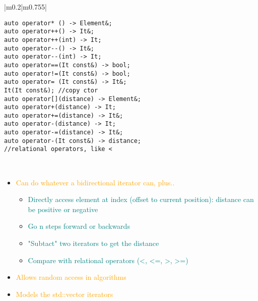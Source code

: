 \documentclass[main.tex,fontsize=8pt,paper=a4,paper=portrait,DIV=calc,]{scrartcl}
\begin{document}
\begin{table}[ht!]
\begin{tabular}{|m{0.2\linewidth}|m{0.755\linewidth}|}
\begin{lstlisting}
auto operator* () -> Element&;
auto operator++() -> It&;
auto operator++(int) -> It;
auto operator--() -> It&;
auto operator--(int) -> It;
auto operator==(It const&) -> bool;
auto operator!=(It const&) -> bool;
auto operator= (It const&) -> It&;
It(It const&); //copy ctor
auto operator[](distance) -> Element&;
auto operator+(distance) -> It;
auto operator+=(distance) -> It&;
auto operator-(distance) -> It;
auto operator-=(distance) -> It&;
auto operator-(It const&) -> distance;
//relational operators, like <
\end{lstlisting}
\, \newline
\begin{itemize}
\item \textcolor{orange}{Can do whatever a bidirectional iterator can, plus..}\newline
  \begin{itemize}
  \item \textcolor{teal}{Directly access element at index (offset to current position): distance can be positive or negative}
  \item \textcolor{teal}{Go n steps forward or backwards}
  \item \textcolor{teal}{"Subtact" two iterators to get the distance}
  \item \textcolor{teal}{Compare with relational operators (<, <=, >, >=)}
  \end{itemize} 
\item \textcolor{orange}{Allows random access in algorithms}
\item \textcolor{orange}{Models the std::vector iterators}
\vspace{-2mm}
\end{itemize} \\
\hline
\end{tabular}
\end{table}
\pagebreak
\end{document}
